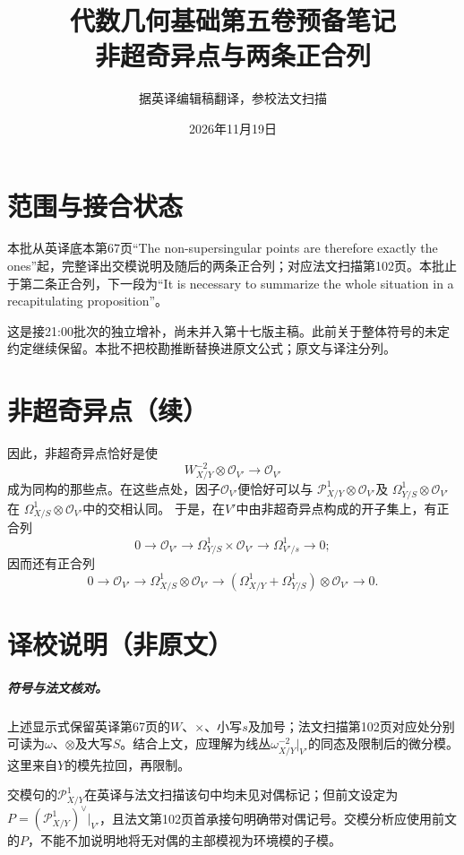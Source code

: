 \documentclass[openany,fontset=fandol]{ctexbook}
\newcommand{\Oa}{\mathcal O}
\begin{document}
\title{代数几何基础第五卷预备笔记\\非超奇异点与两条正合列}
\author{据英译编辑稿翻译，参校法文扫描}
\date{2026年11月19日}
\maketitle
\chapter*{范围与接合状态}
本批从英译底本第67页“The non-supersingular points are therefore exactly the ones”起，完整译出交模说明及随后的两条正合列；对应法文扫描第102页。本批止于第二条正合列，下一段为“It is necessary to summarize the whole situation in a recapitulating proposition”。

这是接21:00批次的独立增补，尚未并入第十七版主稿。此前关于整体符号的未定约定继续保留。本批不把校勘推断替换进原文公式；原文与译注分列。
\chapter*{非超奇异点（续）}
因此，非超奇异点恰好是使
\[
W_{X/Y}^{-2}\otimes\Oa_{V'}\longrightarrow\Oa_{V'}
\]
成为同构的那些点。在这些点处，因子$\Oa_{V'}$便恰好可以与
$\mathcal P^1_{X/Y}\otimes\Oa_{V'}$及
$\Omega^1_{Y/S}\otimes\Oa_{V'}$在
$\Omega^1_{X/S}\otimes\Oa_{V'}$中的交相认同。
于是，在$V'$中由非超奇异点构成的开子集上，有正合列
\[
0\longrightarrow\Oa_{V'}\longrightarrow
\Omega^1_{Y/S}\times\Oa_{V'}\longrightarrow
\Omega^1_{V'/s}\longrightarrow0;
\]
因而还有正合列
\[
0\longrightarrow\Oa_{V'}\longrightarrow
\Omega^1_{X/S}\otimes\Oa_{V'}\longrightarrow
(\Omega^1_{X/Y}+\Omega^1_{Y/S})\otimes\Oa_{V'}
\longrightarrow0.
\]
\chapter*{译校说明（非原文）}
\paragraph{符号与法文核对。}
上述显示式保留英译第67页的$W$、$\times$、小写$s$及加号；法文扫描第102页对应处分别可读为$\omega$、$\otimes$及大写$S$。结合上文，应理解为线丛$\omega_{X/Y}^{-2}|_{V'}$的同态及限制后的微分模。这里来自$Y$的模先拉回，再限制。

交模句的$\mathcal P^1_{X/Y}$在英译与法文扫描该句中均未见对偶标记；但前文设定为$P=(\mathcal P^1_{X/Y})^\vee|_{V'}$，且法文第102页首承接句明确带对偶记号。交模分析应使用前文的$P$，不能不加说明地将无对偶的主部模视为环境模的子模。
\end{document}
